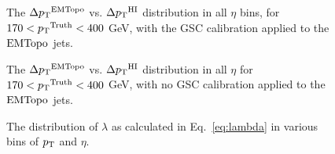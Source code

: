 \begin{figure}
	\centering
	\caption{The $\Delta\mbox{$p_{\mathrm{T}}$}^{\text{EMTopo}}$ vs. $\Delta\mbox{$p_{\mathrm{T}}$}^{\mathrm{HI}}$ distribution in all $\eta$ bins, for $ 170 < \mbox{$p_{\mathrm{T}}$}^{\mathrm{Truth}} < 400$ GeV, with the GSC calibration applied to the $\text{EMTopo}$ jets. }
	\label{fig:deltapT_w_gsc}%
	
	\centering
	\caption{The $\Delta\mbox{$p_{\mathrm{T}}$}^{\text{EMTopo}}$ vs. $\Delta\mbox{$p_{\mathrm{T}}$}^{\mathrm{HI}}$ distribution in all $\eta$ for $ 170 < \mbox{$p_{\mathrm{T}}$}^{\mathrm{Truth}} < 400$ GeV, with no GSC calibration applied to the $\text{EMTopo}$ jets. }
	\label{fig:deltapT_no_gsc}%
\end{figure}


\begin{figure}
	\centering
	\caption{The distribution of $\lambda$ as calculated in Eq.~\ref{eq:lambda} in various bins of $\mbox{$p_{\mathrm{T}}$}$ and $\eta$.}
	\label{fig:lambda}%
\end{figure}

